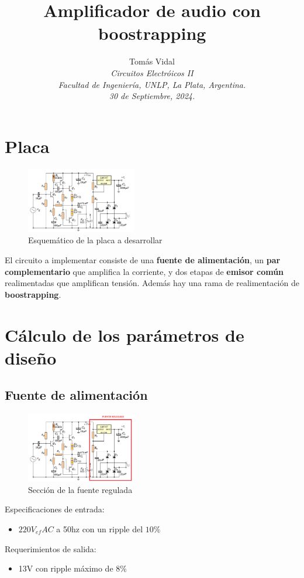 \documentclass[letterpaper, 10 pt, conference]{ieeeconf}  %
\title{\LARGE \bf Amplificador de audio con boostrapping}
\author{
  Tom\'as Vidal\\
  {\it Circuitos Electróicos II}\\
  {\it Facultad de Ingenier\'ia, UNLP, La Plata, Argentina.}\\
  {\it 30 de Septiembre, 2024.}
}                                            %
\begin{document}
\maketitle
\thispagestyle{empty}
\pagestyle{empty}

\section{Placa}
\begin{figure}[H]
  \centering
  \includegraphics[width=0.43\textwidth]{./imagenes/placa.png}
  \caption{Esquemático de la placa a desarrollar}
  \label{fig:placa}
\end{figure}
El circuito a implementar consiste de una \textbf{fuente de alimentación}, un \textbf{par complementario} que amplifica la corriente, y dos etapas de \textbf{emisor común} realimentadas que amplifican tensión. Además hay una rama de realimentación de \textbf{boostrapping}.

\section{Cálculo de los parámetros de diseño}
\subsection{Fuente de alimentación}
\begin{figure}[H]
  \centering
  \includegraphics[width=0.43\textwidth]{./imagenes/placa_fuente.png}
  \caption{Sección de la fuente regulada}
  \label{fig:placa_fuente}
\end{figure}

Especificaciones de entrada:
\begin{itemize}
  \item{$220V_{ef} AC$ a 50hz con un ripple del $10\%$}
\end{itemize}
Requerimientos de salida:
\begin{itemize}
  \item{13V con ripple máximo de $8\%$}
\end{itemize}
\end{document}

